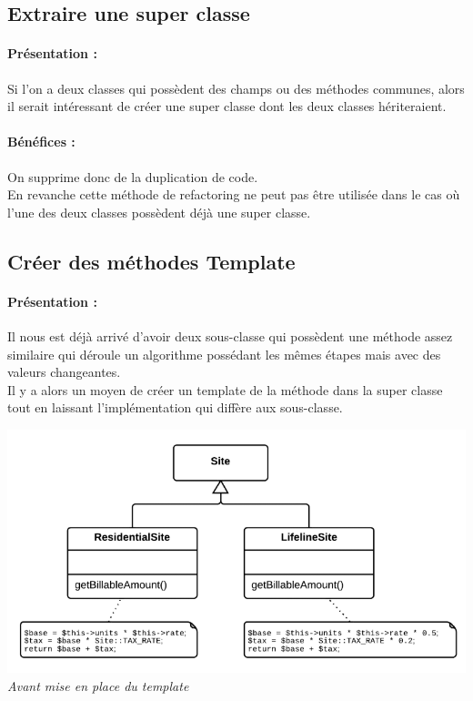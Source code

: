 \documentclass[a4paper,twoside,12pt,openright]{report}
\begin{document}
\subsection{Extraire une super classe}
\paragraph{Présentation :}
Si l'on a deux classes qui possèdent des champs ou des méthodes communes, alors il serait intéressant de créer une super classe dont les deux classes hériteraient.\\

\paragraph{Bénéfices :}
On supprime donc de la duplication de code.\\
En revanche cette méthode de refactoring ne peut pas être utilisée dans le cas où l'une des deux classes possèdent déjà une super classe.\\

\subsection{Créer des méthodes Template}
\paragraph{Présentation :}
Il nous est déjà arrivé d'avoir deux sous-classe qui possèdent une méthode assez similaire qui déroule un algorithme possédant les mêmes étapes mais avec des valeurs changeantes.\\
Il y a alors un moyen de créer un template de la méthode dans la super classe tout en laissant l'implémentation qui diffère aux sous-classe.\\

\begin{center}
\includegraphics[scale=0.75]{Image/Template.png}\\
\itshape{Avant mise en place du template \cite{ref5}}
\end{center}
\end{document}
